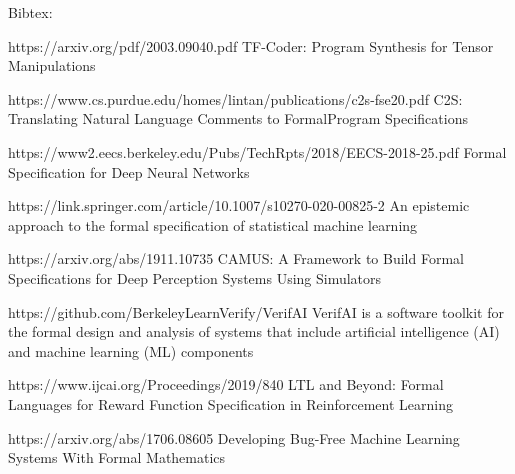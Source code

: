 \documentclass[aspectratio=169]{beamer}
\begin{document}
\begin{frame}

Bibtex:

https://arxiv.org/pdf/2003.09040.pdf
TF-Coder: Program Synthesis for Tensor Manipulations

https://www.cs.purdue.edu/homes/lintan/publications/c2s-fse20.pdf
C2S: Translating Natural Language Comments to FormalProgram Specifications

https://www2.eecs.berkeley.edu/Pubs/TechRpts/2018/EECS-2018-25.pdf
Formal Specification for Deep Neural Networks

https://link.springer.com/article/10.1007/s10270-020-00825-2
An epistemic approach to the formal specification of statistical
machine learning

https://arxiv.org/abs/1911.10735
CAMUS: A Framework to Build Formal Specifications for Deep Perception
Systems Using Simulators

https://github.com/BerkeleyLearnVerify/VerifAI
VerifAI is a software toolkit for the formal design and analysis of
systems that include artificial intelligence (AI) and machine learning
(ML) components

https://www.ijcai.org/Proceedings/2019/840
LTL and Beyond: Formal Languages for Reward Function Specification in
Reinforcement Learning

https://arxiv.org/abs/1706.08605
Developing Bug-Free Machine Learning Systems With Formal Mathematics

\end{frame}
\end{document}
